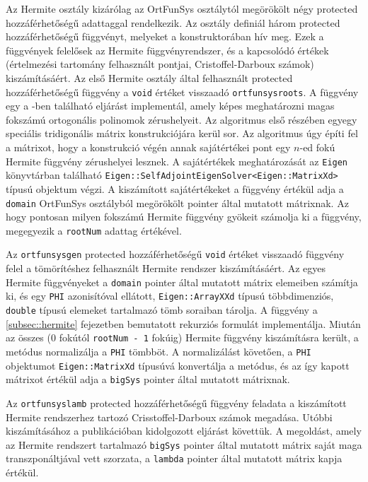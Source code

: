 \documentclass[oneside,titlepage,12pt,a4paper]{report}
\begin{document}
\par Az Hermite osztály kizárólag az OrtFunSys osztálytól megörökölt négy protected hozzáférhetőségű adattaggal rendelkezik. 
Az osztály definiál három protected hozzáférhetőségű függvényt, melyeket a konstruktorában hív meg. Ezek a függvények felelősek az Hermite függvényrendszer, és a kapcsolódó értékek (értelmezési tartomány felhasznált pontjai, Cristoffel-Darboux számok) kiszámításáért. 
Az első Hermite osztály által felhasznált protected hozzáférhetőségű függvény a \texttt{void} értéket visszaadó \texttt{ortfunsysroots}.
A függvény egy a \cite{gautschi}-ben található eljárást implementál, amely képes meghatározni magas fokszámú ortogonális polinomok zérushelyeit. Az algoritmus első részében egyegy speciális tridigonális mátrix konstrukciójára kerül sor. Az algoritmus úgy építi fel a mátrixot, hogy a konstrukció végén annak sajátértékei pont egy $n$-ed fokú Hermite függvény zérushelyei lesznek. A sajátértékek meghatározását az \texttt{Eigen} könyvtárban található \texttt{Eigen::SelfAdjointEigenSolver<Eigen::MatrixXd>} típusú objektum végzi. A kiszámított sajátértékeket a függvény értékül adja a \texttt{domain} OrtFunSys osztályból megörökölt pointer által mutatott mátrixnak. Az hogy pontosan milyen fokszámú Hermite függvény gyökeit számolja ki a függvény, megegyezik a \texttt{rootNum} adattag értékével.   
\par Az \texttt{ortfunsysgen} protected hozzáférhetőségű \texttt{void} értéket visszaadó függvény felel a tömörítéshez felhasznált Hermite rendszer kiszámításáért. Az egyes Hermite függvényeket a \texttt{domain} pointer által mutatott mátrix elemeiben számítja ki, és egy \texttt{PHI} azonisítóval ellátott, \texttt{Eigen::ArrayXXd} típusú többdimenziós, \texttt{double} típusú elemeket tartalmazó tömb soraiban tárolja. A függvény a \ref{subsec::hermite} fejezetben bemutatott rekurziós formulát implementálja. Miután az összes (0 fokútól \texttt{rootNum - 1} fokúig) Hermite függvény kiszámításra került, a metódus normalizálja a \texttt{PHI} tömbböt. A normalizálást követően, a \texttt{PHI} objektumot \texttt{Eigen::MatrixXd} típusúvá konvertálja a metódus, és az így kapott mátrixot értékül adja a \texttt{bigSys} pointer által mutatott mátrixnak.
\par Az \texttt{ortfunsyslamb} protected hozzáférhetőségű függvény feladata a
kiszámított Hermite rendszerhez tartozó Crisstoffel-Darboux számok megadása. Utóbbi kiszámításához a \cite{} publikációban kidolgozott eljárást követtük. A megoldást, amely az Hermite rendszert tartalmazó \texttt{bigSys} pointer által mutatott mátrix saját maga transzponáltjával vett szorzata, a \texttt{lambda} pointer által mutatott mátrix kapja értékül. 
\end{document}
